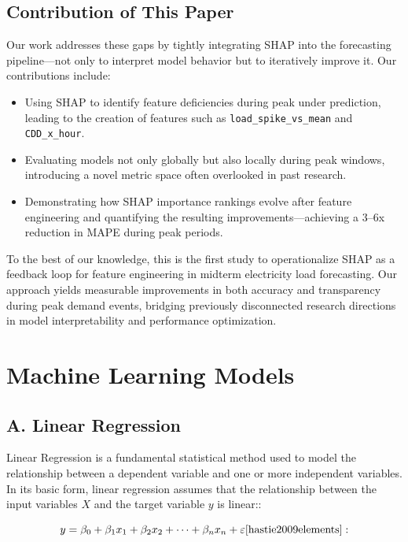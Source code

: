 \documentclass{ifacconf}
\begin{document}
\subsection{Contribution of This Paper}

Our work addresses these gaps by tightly integrating SHAP into the forecasting pipeline—not only to interpret model behavior but to iteratively improve it. Our contributions include:

\begin{itemize}
    \item Using SHAP to identify feature deficiencies during peak under prediction, leading to the creation of features such as \texttt{load\_spike\_vs\_mean} and \texttt{CDD\_x\_hour}.
    \item Evaluating models not only globally but also locally during peak windows, introducing a novel metric space often overlooked in past research.
    \item Demonstrating how SHAP importance rankings evolve after feature engineering and quantifying the resulting improvements—achieving a 3–6x reduction in MAPE during peak periods.
\end{itemize}

To the best of our knowledge, this is the first study to operationalize SHAP as a feedback loop for feature engineering in midterm electricity load forecasting. Our approach yields measurable improvements in both accuracy and transparency during peak demand events, bridging previously disconnected research directions in model interpretability and performance optimization.



\section{Machine Learning Models}
\subsection{A. Linear Regression}
Linear Regression is a fundamental statistical method used to model the relationship between a dependent variable and one or more independent variables. In its basic form, linear regression assumes that the relationship between the input variables $X$ and the target variable $y$ is linear:\cite{hastie2009elements}:

\begin{equation}
y = \beta_0 + \beta_1 x_1 + \beta_2 x_2 + \dots + \beta_n x_n + \varepsilon
\label{eq:linear_regression}
\cite{hastie2009elements}:
\end{equation}
\end{document}
